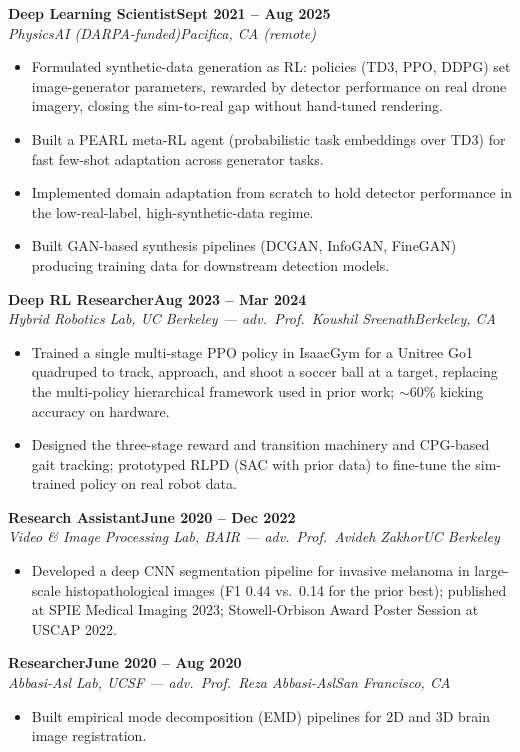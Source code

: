 \documentclass[10pt]{article}
\newcommand{\role}[4]{\textbf{#1}\hfill\textbf{#2}\\\textit{#3}\hfill\textit{#4}}
\begin{document}
\role{Deep Learning Scientist}{Sept 2021 -- Aug 2025}{PhysicsAI (DARPA-funded)}{Pacifica, CA (remote)}
\begin{itemize}
\item Formulated synthetic-data generation as RL: policies (TD3, PPO, DDPG) set image-generator parameters, rewarded by detector performance on real drone imagery, closing the sim-to-real gap without hand-tuned rendering.
\item Built a PEARL meta-RL agent (probabilistic task embeddings over TD3) for fast few-shot adaptation across generator tasks.
\item Implemented domain adaptation from scratch to hold detector performance in the low-real-label, high-synthetic-data regime.
\item Built GAN-based synthesis pipelines (DCGAN, InfoGAN, FineGAN) producing training data for downstream detection models.
\end{itemize}

\role{Deep RL Researcher}{Aug 2023 -- Mar 2024}{Hybrid Robotics Lab, UC Berkeley --- adv.\ Prof.\ Koushil Sreenath}{Berkeley, CA}
\begin{itemize}
\item Trained a single multi-stage PPO policy in IsaacGym for a Unitree Go1 quadruped to track, approach, and shoot a soccer ball at a target, replacing the multi-policy hierarchical framework used in prior work; $\sim$60\% kicking accuracy on hardware.
\item Designed the three-stage reward and transition machinery and CPG-based gait tracking; prototyped RLPD (SAC with prior data) to fine-tune the sim-trained policy on real robot data.
\end{itemize}

\role{Research Assistant}{June 2020 -- Dec 2022}{Video \& Image Processing Lab, BAIR --- adv.\ Prof.\ Avideh Zakhor}{UC Berkeley}
\begin{itemize}
\item Developed a deep CNN segmentation pipeline for invasive melanoma in large-scale histopathological images (F1 0.44 vs.\ 0.14 for the prior best); published at SPIE Medical Imaging 2023; Stowell-Orbison Award Poster Session at USCAP 2022.
\end{itemize}

\role{Researcher}{June 2020 -- Aug 2020}{Abbasi-Asl Lab, UCSF --- adv.\ Prof.\ Reza Abbasi-Asl}{San Francisco, CA}
\begin{itemize}
\item Built empirical mode decomposition (EMD) pipelines for 2D and 3D brain image registration.
\end{itemize}
\end{document}
